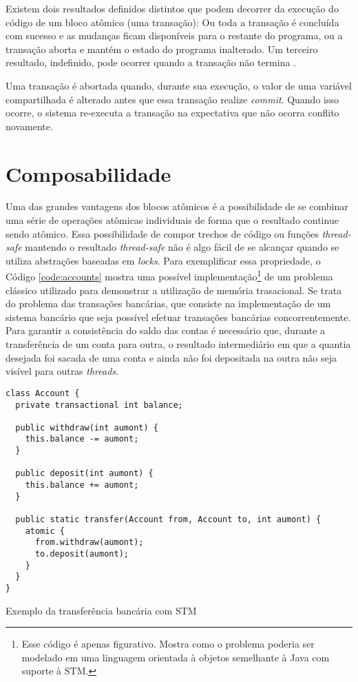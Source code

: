 Existem dois resultados definidos distintos que podem decorrer da execução do código de um bloco atômico (uma transação): Ou toda a transação é concluída com sucesso e as mudanças ficam disponíveis para o restante do programa, ou a transação aborta e mantém o estado do programa inalterado. Um terceiro resultado, indefinido, pode ocorrer quando a transação não termina \cite{helinefficiency}.

Uma transação é abortada quando, durante sua execução, o valor de uma variável compartilhada é alterado antes que essa transação realize \emph{commit}. Quando isso ocorre, o sistema re-executa a transação na expectativa que não ocorra conflito novamente.


\section{Composabilidade}

Uma das grandes vantagens dos blocos atômicos é a possibilidade de se combinar uma série de operações atômicas individuais de forma que o resultado continue sendo atômico. Essa possibilidade de compor trechos de código ou funções \emph{thread-safe} mantendo o resultado \emph{thread-safe} não é algo fácil de se alcançar quando se utiliza abstrações baseadas em \emph{locks}. Para exemplificar essa propriedade, o Código \ref{code:accounts} mostra uma possível implementação\footnote{Esse código é apenas figurativo. Mostra como o problema poderia ser modelado em uma linguagem orientada à objetos semelhante à Java com suporte à STM.} de um problema clássico utilizado para demonstrar a utilização de memória trasacional. Se trata do problema das transações bancárias, que consiste na implementação de um sistema bancário que seja possível efetuar transações bancárias concorrentemente. Para garantir a consistência do saldo das contas é necessário que, durante a transferência de um conta para outra, o resultado intermediário em que a quantia desejada foi sacada de uma conta e ainda não foi depositada na outra não seja visível para outras \emph{threads}.

\begin{listing}
  \begin{verbatim}
class Account {
  private transactional int balance;
  
  public withdraw(int aumont) {
    this.balance -= aumont;
  }

  public deposit(int aumont) {
    this.balance += aumont;
  }

  public static transfer(Account from, Account to, int aumont) {
    atomic {
      from.withdraw(aumont);
      to.deposit(aumont);
    }
  }
}
  \end{verbatim}
  \caption{Exemplo da transferência bancária com STM}
  \label{code:accounts}
\end{listing}

